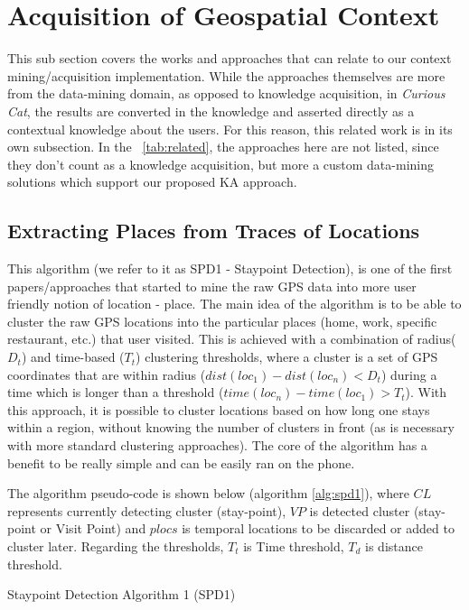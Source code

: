 \section{Acquisition of Geospatial Context}
This sub section covers the works and approaches that can relate to our 
context mining/acquisition implementation. While the approaches themselves are
more from the data-mining domain, as opposed to knowledge acquisition, in
\emph{Curious Cat}, the results are converted in the knowledge and asserted 
directly as a contextual knowledge about the users. For this reason, this
related work is in its own subsection. In the \tablename~\ref{tab:related}, the 
approaches here are not listed, since they don't count as a knowledge
acquisition, but more a custom data-mining solutions which support our
proposed KA approach.

\subsection{Extracting Places from Traces of Locations}
\label{section:SPD1}
This algorithm (we refer to it as SPD1 - Staypoint Detection), is one of the 
first papers/approaches that started to mine the raw GPS data
into more user friendly notion of location - place.\parencite{Kang2005} The main
idea of the algorithm is to be able to cluster the raw GPS locations into the
particular places (home, work, specific restaurant, etc.) that user visited. 
This is achieved with a combination of radius($D_t$) and time-based ($T_t$) 
clustering thresholds, where a cluster is a set of GPS coordinates that are 
within radius ($dist(loc_1) - dist(loc_n) < D_t$) during a time which is longer 
than a threshold ($time(loc_n)-time(loc_1) > T_t$). With this approach, it is
possible to cluster locations based on how long one stays within a region, 
without knowing the number of clusters in front (as is necessary with more
standard clustering approaches). The core of the algorithm has a benefit
to be really simple and can be easily ran on the phone.

The algorithm pseudo-code is shown below (algorithm \ref{alg:spd1}), where $CL$ 
represents currently 
detecting cluster (stay-point), $VP$ is detected cluster (stay-point or Visit 
Point) and $plocs$ is temporal locations to be discarded or added to cluster
later. Regarding the thresholds, $T_t$ is Time threshold, $T_d$ is distance 
threshold.

\begin{algorithm}[htb]
\caption{Staypoint Detection Algorithm 1 (SPD1)}
\label{alg:spd1}

\vspace{5pt}
\vspace{5pt}
{
}
\end{algorithm}

